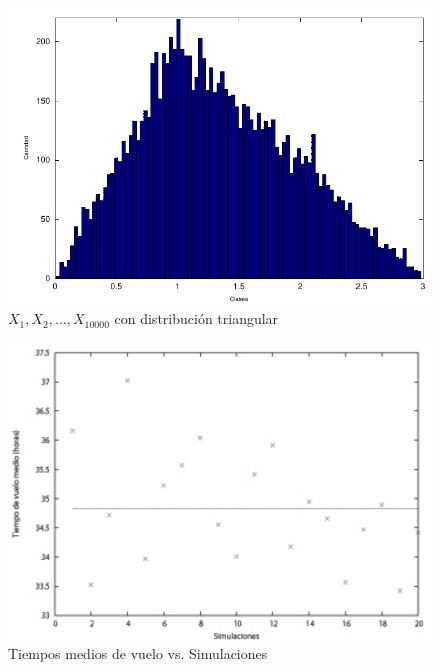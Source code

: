 \documentclass{sig-alternate}
\begin{document}
\begin{figure}[hp]
\centering
\includegraphics[scale=0.8]{graficos/triangular}
\caption{$X_{1}, X_{2}, \dots, X_{10000}$ con distribuci\'{o}n triangular}
\label{fig:triangular}
\end{figure}

\begin{figure}[hp]
\centering
\includegraphics[scale=0.8]{graficos/tiemposvuelo}
\caption{Tiempos medios de vuelo vs. Simulaciones}
\label{fig:warp}
\end{figure}
\end{document}
